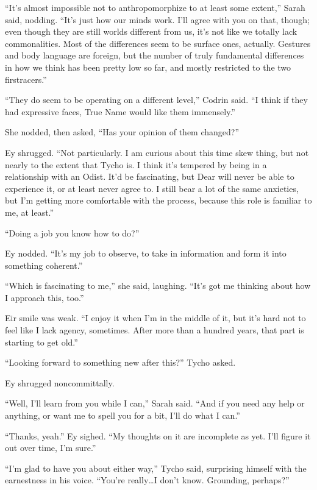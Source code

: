 ``It's almost impossible not to anthropomorphize to at least some extent,'' Sarah said, nodding. ``It's just how our minds work. I'll agree with you on that, though; even though they are still worlds different from us, it's not like we totally lack commonalities. Most of the differences seem to be surface ones, actually. Gestures and body language are foreign, but the number of truly fundamental differences in how we think has been pretty low so far, and mostly restricted to the two firstracers.''

``They do seem to be operating on a different level,'' Codrin said. ``I think if they had expressive faces, True Name would like them immensely.''

She nodded, then asked, ``Has your opinion of them changed?''

Ey shrugged. ``Not particularly. I am curious about this time skew thing, but not nearly to the extent that Tycho is. I think it's tempered by being in a relationship with an Odist. It'd be fascinating, but Dear will never be able to experience it, or at least never agree to. I still bear a lot of the same anxieties, but I'm getting more comfortable with the process, because this role is familiar to me, at least.''

``Doing a job you know how to do?''

Ey nodded. ``It's my job to observe, to take in information and form it into something coherent.''

``Which is fascinating to me,'' she said, laughing. ``It's got me thinking about how I approach this, too.''

Eir smile was weak. ``I enjoy it when I'm in the middle of it, but it's hard not to feel like I lack agency, sometimes. After more than a hundred years, that part is starting to get old.''

``Looking forward to something new after this?'' Tycho asked.

Ey shrugged noncommittally.

``Well, I'll learn from you while I can,'' Sarah said. ``And if you need any help or anything, or want me to spell you for a bit, I'll do what I can.''

``Thanks, yeah.'' Ey sighed. ``My thoughts on it are incomplete as yet. I'll figure it out over time, I'm sure.''

``I'm glad to have you about either way,'' Tycho said, surprising himself with the earnestness in his voice. ``You're really\ldots I don't know. Grounding, perhaps?''

